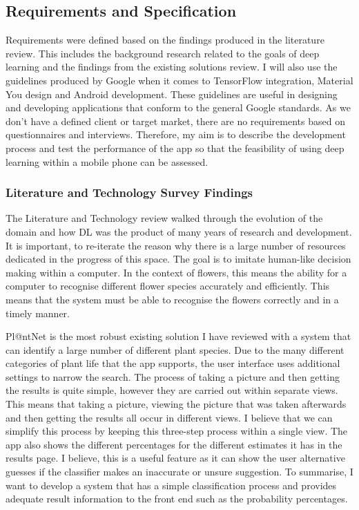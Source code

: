 \documentclass{article}
\begin{document}
\subsection{Requirements and Specification}

\label{subsec:req}

Requirements were defined based on the findings produced in the literature review. This includes the background research 
related to the goals of deep learning and the findings from the existing solutions review. I will also use the 
guidelines produced by Google when it comes to TensorFlow integration, Material You design and Android development. 
These guidelines are useful in designing and developing applications that conform to the general Google standards. As we
don't have a defined client or target market, there are no requirements based on questionnaires and interviews. 
Therefore, my aim is to describe the development process and test the performance of the app so that the feasibility of 
using deep learning within a mobile phone can be assessed. 

\subsubsection{Literature and Technology Survey Findings}

The Literature and Technology review walked through the evolution of the domain and how DL was the product of many years
of research and development. It is important, to re-iterate the reason why there is a large number of resources 
dedicated in the progress of this space. The goal is to imitate human-like decision making within a computer. In the 
context of flowers, this means the ability for a computer to recognise different flower species accurately and 
efficiently. This means that the system must be able to recognise the flowers correctly and in a timely manner.

\par

Pl@ntNet is the most robust existing solution I have reviewed with a system that can identify a large number of 
different plant species. Due to the many different categories of plant life that the app supports, the user interface 
uses additional settings to narrow the search. The process of taking a picture and then getting the results is quite 
simple, however they are carried out within separate views.  This means that taking a picture, viewing the picture that 
was taken afterwards and then getting the results all occur in different views. I believe that we can simplify this 
process by keeping this three-step process within a single view. The app also shows the different percentages for the 
different estimates it has in the results page. I believe, this is a useful feature as it can show the user alternative 
guesses if the classifier makes an inaccurate or unsure suggestion. To summarise, I want to develop a system that has a 
simple classification process and provides adequate result information to the front end such as the probability 
percentages. 
\end{document}

